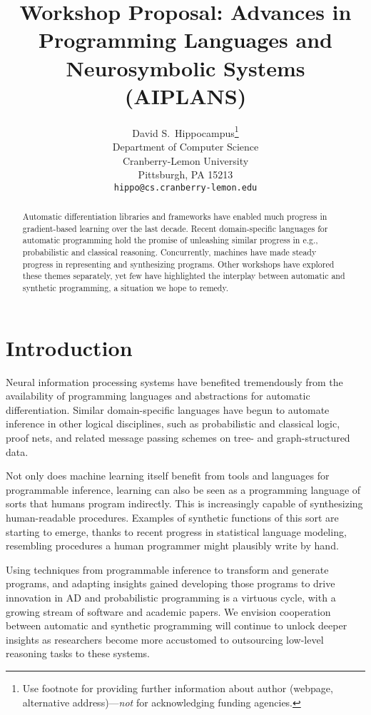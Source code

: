 \documentclass{article}
\title{Workshop Proposal: Advances in Programming Languages and Neurosymbolic Systems (AIPLANS)}
\author{%
    David S.~Hippocampus\thanks{Use footnote for providing further information
    about author (webpage, alternative address)---\emph{not} for acknowledging
    funding agencies.} \\
    Department of Computer Science\\
    Cranberry-Lemon University\\
    Pittsburgh, PA 15213 \\
    \texttt{hippo@cs.cranberry-lemon.edu} \\
}
\begin{document}
    \maketitle

    \begin{abstract}
        Automatic differentiation libraries and frameworks have enabled much progress in gradient-based learning over the last decade. Recent domain-specific languages for automatic programming hold the promise of unleashing similar progress in e.g., probabilistic and classical reasoning. Concurrently, machines have made steady progress in representing and synthesizing programs. Other workshops have explored these themes separately, yet few have highlighted the interplay between automatic and synthetic programming, a situation we hope to remedy.
    \end{abstract}

    \section{Introduction}

    Neural information processing systems have benefited tremendously from the availability of programming languages and abstractions for automatic differentiation. Similar domain-specific languages have begun to automate inference in other logical disciplines, such as probabilistic and classical logic, proof nets, and related message passing schemes on tree- and graph-structured data.

    Not only does machine learning itself benefit from tools and languages for programmable inference, learning can also be seen as a programming language of sorts that humans program indirectly. This is increasingly capable of synthesizing human-readable procedures. Examples of synthetic functions of this sort are starting to emerge, thanks to recent progress in statistical language modeling, resembling procedures a human programmer might plausibly write by hand.

    Using techniques from programmable inference to transform and generate programs, and adapting insights gained developing those programs to drive innovation in AD and probabilistic programming is a virtuous cycle, with a growing stream of software and academic papers. We envision cooperation between automatic and synthetic programming will continue to unlock deeper insights as researchers become more accustomed to outsourcing low-level reasoning tasks to these systems.
\end{document}
